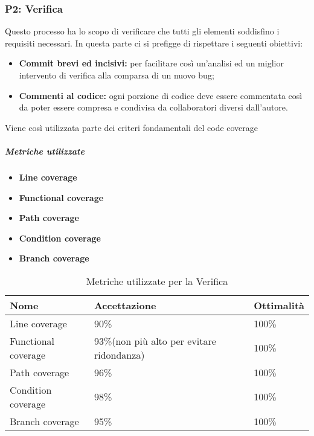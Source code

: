 \subsubsection{P2: Verifica}
Questo processo ha lo scopo di verificare che tutti gli elementi soddisfino i requisiti necessari. In questa parte ci si prefigge di rispettare i seguenti obiettivi:
\begin{itemize}
	\item{\textbf{Commit brevi ed incisivi:} per facilitare così un'analisi ed un miglior intervento di verifica alla comparsa di un nuovo bug;}
	\item{\textbf{Commenti al codice:} ogni porzione di codice deve essere commentata così da poter essere compresa e condivisa da collaboratori diversi dall'autore.}
\end{itemize}
Viene così utilizzata parte dei criteri fondamentali del code coverage\pedice
\subparagraph{Metriche utilizzate}
\begin{itemize}
	\item{\textbf{Line coverage}}
	\item{\textbf{Functional coverage}}
	\item{\textbf{Path coverage}}
	\item{\textbf{Condition coverage}}
	\item{\textbf{Branch coverage}}
\end{itemize}
\begin{table}[H]
	\centering
	\renewcommand{\arraystretch}{2} 
	\begin{tabular}{|l|l|l|}
		\rowcolor{orange!50}
		\hline
		\textbf{Nome} & \textbf{Accettazione} & \textbf{Ottimalità} \\
		\hline
		Line coverage & 90\% & 100\% \\
		\hline
		Functional coverage & 93\%(non più alto per evitare ridondanza) & 100\% \\
		\hline
		Path coverage & 96\% & 100\% \\
		\hline
		Condition coverage & 98\% & 100\% \\
		\hline
		Branch coverage & 95\% & 100\% \\
		\hline
	\end{tabular}
	\caption{Metriche utilizzate per la Verifica}
\end{table}
